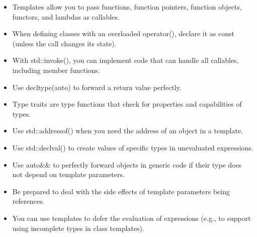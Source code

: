 
\begin{itemize}
\item 
Templates allow you to pass functions, function pointers, function objects, functors, and lambdas as callables.

\item 
When defining classes with an overloaded operator(), declare it as const (unless the call changes its state).

\item 
With std::invoke(), you can implement code that can handle all callables, including member functions.

\item 
Use decltype(auto) to forward a return value perfectly.

\item 
Type traits are type functions that check for properties and capabilities of types.

\item 
Use std::addressof() when you need the address of an object in a template.

\item 
Use std::declval() to create values of specific types in unevaluated expressions.

\item 
Use auto\&\& to perfectly forward objects in generic code if their type does not depend on template
parameters.

\item 
Be prepared to deal with the side effects of template parameters being references.

\item 
You can use templates to defer the evaluation of expressions (e.g., to support using incomplete types in class templates).
\end{itemize}